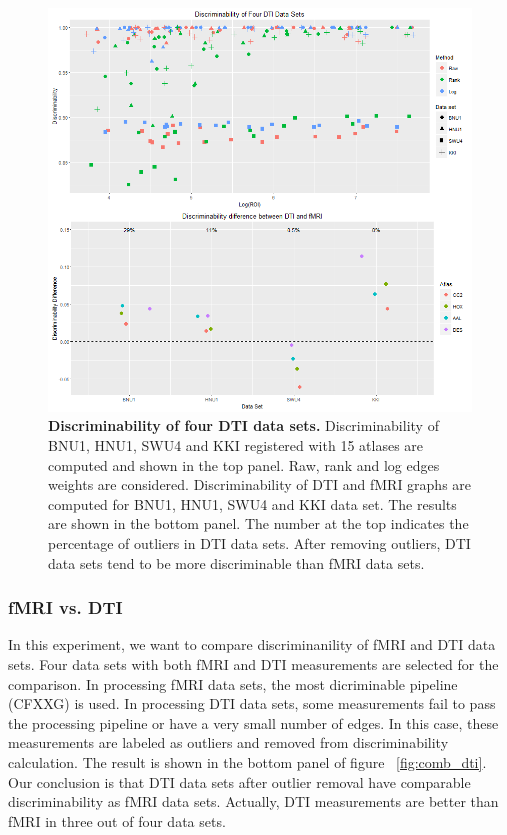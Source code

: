\documentclass{article}
\begin{document}
\begin{figure}[ht!]
	\includegraphics[width=\linewidth]{../Figs/comb_dti.png}
	\caption{{ \bf Discriminability of four DTI data sets.} Discriminability of BNU1, HNU1, SWU4 and KKI registered with 15 atlases are computed and shown in the top panel. Raw, rank and log edges weights are considered. Discriminability of DTI and fMRI graphs are computed for BNU1, HNU1, SWU4 and KKI data set. The results are shown in the bottom panel. The number at the top indicates the percentage of outliers in DTI data sets. After removing outliers, DTI data sets tend to be more discriminable than fMRI data sets.}
	\label{fig:dti}
\end{figure}

\subsubsection{fMRI vs. DTI}
In this experiment, we want to compare discriminanility of fMRI and DTI data sets. Four data sets with both fMRI and DTI measurements are selected for the comparison. In processing fMRI data sets, the most dicriminable pipeline (CFXXG) is used. In processing DTI data sets, some measurements fail to pass the processing pipeline or have a very small number of edges. In this case, these measurements are labeled as outliers and removed from discriminability calculation. The result is shown in the bottom panel of figure ~\ref{fig:comb_dti}. Our conclusion is that DTI data sets after outlier removal have comparable discriminability as fMRI data sets. Actually, DTI measurements are better than fMRI in three out of four data sets. 
\end{document}
